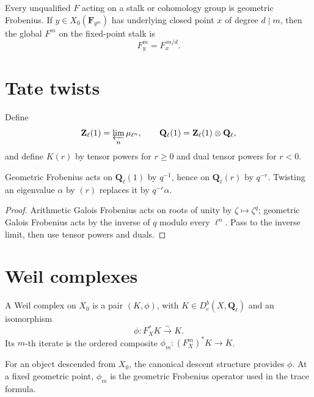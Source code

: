 \begin{convention}[title={Geometric Frobenius}]
\label{conv:geometric-frobenius}
Every unqualified \(F\) acting on a stalk or cohomology group is geometric
Frobenius.  If \(y\in X_0(\mathbf F_{q^m})\) has underlying closed point
\(x\) of degree \(d\mid m\), then the global \(F^m\) on the fixed-point stalk
is
\[
 F_y^m=F_x^{\,m/d}.
\]
\end{convention}

\section{Tate twists}

\begin{definition}
\label{def:tate-twist}
Define
\[
 \mathbf Z_\ell(1)=\varprojlim_n\mu_{\ell^n},\qquad
 \mathbf Q_\ell(1)=\mathbf Z_\ell(1)\otimes\mathbf Q_\ell,
\]
and define \(K(r)\) by tensor powers for \(r\geq0\) and dual tensor powers for
\(r<0\).
\end{definition}

\begin{proposition}
\label{prop:frob-tate}
Geometric Frobenius acts on \(\mathbf Q_\ell(1)\) by \(q^{-1}\), hence on
\(\mathbf Q_\ell(r)\) by \(q^{-r}\).  Twisting an eigenvalue \(\alpha\) by
\((r)\) replaces it by \(q^{-r}\alpha\).
\end{proposition}

\begin{proof}
Arithmetic Galois Frobenius acts on roots of unity by
\(\zeta\mapsto\zeta^q\); geometric Galois Frobenius acts by the inverse of
\(q\) modulo every \(\ell^n\).  Pass to the inverse limit, then use tensor
powers and duals.
\end{proof}

\section{Weil complexes}

\begin{definition}
\label{def:weil-complex}
A Weil complex on \(X_0\) is a pair \((K,\phi)\), with
\(K\in D^b_c(X,\mathbf Q_\ell)\) and an isomorphism
\[
 \phi:F_X^*K\xrightarrow{\sim}K.
\]
Its \(m\)-th iterate is the ordered composite
\(\phi_m:(F_X^m)^*K\to K\).
\end{definition}

For an object descended from \(X_0\), the canonical descent structure provides
\(\phi\).  At a fixed geometric point, \(\phi_m\) is the geometric Frobenius
operator used in the trace formula.

